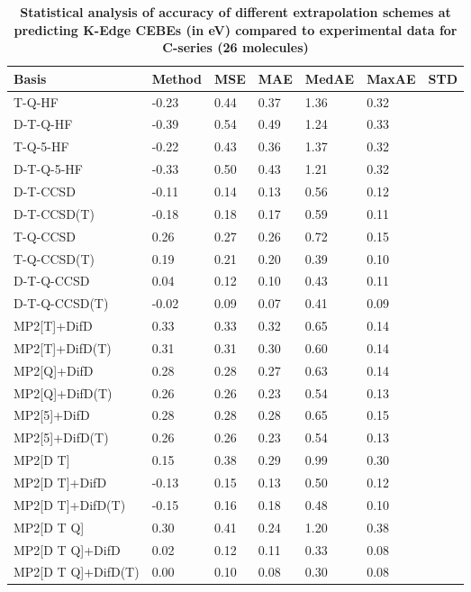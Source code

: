 \begin{table}
  \caption{\textbf{Statistical analysis of accuracy of different extrapolation schemes at predicting K-Edge CEBEs (in eV) compared to experimental data for C-series (26 molecules)}}
  \label{tbl:extrap-scheme-summary-c}
  \begin{tabular}{l l l l l l l }
    \hline
    \textbf{Basis} & \textbf{Method} & \textbf{MSE} & \textbf{MAE} & \textbf{MedAE} & \textbf{MaxAE} & \textbf{STD} \\ 
    \hline
    T-Q-HF & -0.23 & 0.44 & 0.37 & 1.36 & 0.32 \\ 
    D-T-Q-HF & -0.39 & 0.54 & 0.49 & 1.24 & 0.33 \\ 
    T-Q-5-HF & -0.22 & 0.43 & 0.36 & 1.37 & 0.32 \\ 
    D-T-Q-5-HF & -0.33 & 0.50 & 0.43 & 1.21 & 0.32 \\ 
    D-T-CCSD & -0.11 & 0.14 & 0.13 & 0.56 & 0.12 \\ 
    D-T-CCSD(T) & -0.18 & 0.18 & 0.17 & 0.59 & 0.11 \\ 
    T-Q-CCSD & 0.26 & 0.27 & 0.26 & 0.72 & 0.15 \\ 
    T-Q-CCSD(T) & 0.19 & 0.21 & 0.20 & 0.39 & 0.10 \\ 
    D-T-Q-CCSD & 0.04 & 0.12 & 0.10 & 0.43 & 0.11 \\ 
    D-T-Q-CCSD(T) & -0.02 & 0.09 & 0.07 & 0.41 & 0.09 \\ 
    MP2[T]+DifD & 0.33 & 0.33 & 0.32 & 0.65 & 0.14 \\ 
    MP2[T]+DifD(T) & 0.31 & 0.31 & 0.30 & 0.60 & 0.14 \\ 
    MP2[Q]+DifD & 0.28 & 0.28 & 0.27 & 0.63 & 0.14 \\ 
    MP2[Q]+DifD(T) & 0.26 & 0.26 & 0.23 & 0.54 & 0.13 \\ 
    MP2[5]+DifD & 0.28 & 0.28 & 0.28 & 0.65 & 0.15 \\ 
    MP2[5]+DifD(T) & 0.26 & 0.26 & 0.23 & 0.54 & 0.13 \\ 
    MP2[D T] & 0.15 & 0.38 & 0.29 & 0.99 & 0.30 \\ 
    MP2[D T]+DifD & -0.13 & 0.15 & 0.13 & 0.50 & 0.12 \\ 
    MP2[D T]+DifD(T) & -0.15 & 0.16 & 0.18 & 0.48 & 0.10 \\ 
    MP2[D T Q] & 0.30 & 0.41 & 0.24 & 1.20 & 0.38 \\ 
    MP2[D T Q]+DifD & 0.02 & 0.12 & 0.11 & 0.33 & 0.08 \\ 
    MP2[D T Q]+DifD(T) & 0.00 & 0.10 & 0.08 & 0.30 & 0.08 \\ 

\end{tabular}
\end{table}
